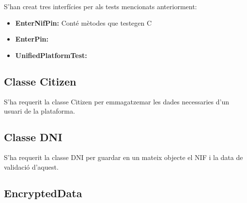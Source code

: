 \documentclass[12pt, letterpaper]{article}
\begin{document}
S'han creat tres interfícies per als tests mencionats anteriorment:
\begin{itemize}
  \item \textbf{EnterNifPin:} Conté mètodes que testegen C
  \item \textbf{EnterPin:}
  \item \textbf{UnifiedPlatformTest:}
\end{itemize}


\subsection{Classe Citizen}
\label{citizen}
S'ha requerit la classe Citizen per emmagatzemar les dades necessaries d'un usuari de la plataforma.

\subsection{Classe DNI}
\label{dni}
S'ha requerit la classe DNI per guardar en un mateix objecte el NIF i la data de validació d'aquest.

\subsection{EncryptedData}
\label{encyptedData}
\end{document}
